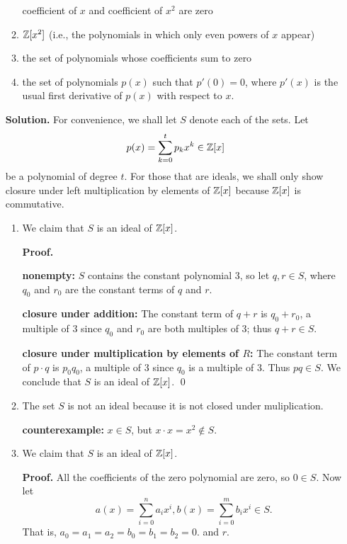 \begin{enumerate}
\begin{enumerate}
                           coefficient of $x$ and coefficient of $x^2$ are zero
                     \item $\mathbb{Z}[x^2]$ (i.e., the polynomials in which only even
                           powers of $x$ appear)
                     \item the set of polynomials whose coefficients sum to
                           zero
                     \item the set of polynomials $p(x)$ such that $p'(0) = 0$,
                           where $p'(x)$ is the usual first derivative of $p(x)$
                           with respect to $x$.
                  \end{enumerate}

      \textbf{Solution.} For convenience, we shall let $S$ denote each of the
      sets. Let
      $$p(x) = \sum_{k=0}^tp_kx^k \in \mathbb{Z}[x]$$
      be a polynomial of degree $t$. For those that are ideals, we shall only
      show closure under left multiplication by elements of $\mathbb{Z}[x]$ because
      $\mathbb{Z}[x]$ is commutative.

      \begin{enumerate}
         \item We claim that $S$ is an ideal of $\mathbb{Z}[x]$.

               \textbf{Proof.} 

               \textbf{nonempty:} $S$ contains the constant polynomial 3, so let
               $q, r \in S$, where $q_0$ and $r_0$ are the constant terms of $q$
               and $r$. 

               \textbf{closure under addition:} The constant
               term of $q + r$ is $q_0 + r_0$, a multiple of 3 since $q_0$ and
               $r_0$ are both multiples of 3; thus $q + r \in S$.

               \textbf{closure under multiplication by elements of $R$:} The
               constant term of $p \cdot q$ is $p_0q_0$, a multiple of 3 since
               $q_0$ is a multiple of 3. Thus $pq \in S$. We conclude that $S$
               is an ideal of $\mathbb{Z}[x]$. \qed
         \item The set $S$ is not an ideal because it is not closed under
               muliplication.

               \textbf{counterexample:} $x \in S$, but
               $x \cdot x = x^2 \notin S$.
         \item We claim that $S$ is an ideal of $\mathbb{Z}[x]$.

               \textbf{Proof.} All the coefficients of the zero polynomial are
               zero, so $0 \in S$. Now let
               $$a(x) = \sum_{i=0}^na_ix^i, b(x) = \sum_{i=0}^mb_ix^i \in S.$$
               That is, $a_0 = a_1 = a_2 = b_0 = b_1 = b_2 = 0$.
               and $r$. 


\end{enumerate}
\end{enumerate}
